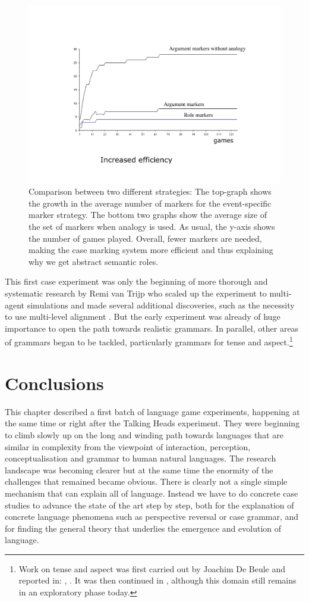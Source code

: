 \begin{figure}[htbp]
  \centerline{\includegraphics[width=.70\textwidth]{chap10/figs/comparison.pdf}}
\caption{\label{fig:comparison} 
Comparison between two different strategies: The top-graph shows the growth in the average number of 
markers for the event-specific marker strategy. 
The bottom two graphs show the average size of the set of markers when analogy is used. As usual, the y-axis shows 
the number of games played. Overall, fewer markers are needed, making the case marking system more efficient 
and thus explaining why we get abstract semantic roles.}
\end{figure}

This first case experiment was only the beginning of more thorough and systematic research by Remi van Trijp who 
scaled up the experiment to multi-agent simulations and made several additional discoveries, such as the necessity 
to use multi-level alignment \citep{Steels:07d}. 
But the early experiment was already of huge importance to open the path towards realistic grammars. 
In parallel, other areas of grammars began to be tackled, 
particularly grammars for tense and aspect.\footnote{
Work on tense and aspect was first carried out by Joachim De Beule and reported in: \cite{DeBeule:2004}, \cite{DeBeule:2006}. 
It was then continued in \citep{Gerasymova:2012}, 
although this domain still remains in an exploratory phase today.}

\section{Conclusions} 

This chapter described a first batch of language game experiments, happening at the same time or right after the Talking Heads 
experiment. They were beginning to climb slowly up on the long and winding path towards languages that are similar in 
complexity from the viewpoint of interaction, perception, conceptualisation and grammar to human natural languages. 
The research landscape was becoming clearer but at the same time the enormity of the challenges that remained
became obvious. There is clearly not a single simple mechanism that can explain all of language. Instead we have 
to do concrete case studies to advance the state of the art step by step, both for the explanation of concrete language 
phenomena such as perspective reversal or case grammar, and for finding the general theory that underlies the 
emergence and evolution of language. 

